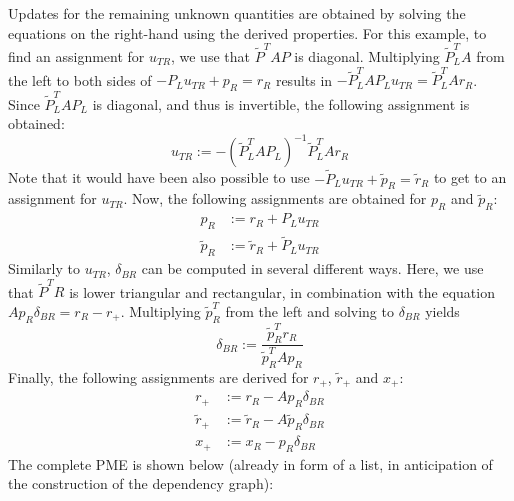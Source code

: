 %
Updates for the remaining unknown quantities are obtained by solving the equations on the right-hand using the derived properties. For this example, to find an assignment for $u_{TR}$, we use that $\tilde{P}^T A P$ is diagonal. Multiplying $\tilde{P}_L^T A$ from the left to both sides of $- P_L u_{TR} + p_R = r_R$ results in $- \tilde{P}_L^T A P_L u_{TR} = \tilde{P}_L^T A r_R$. Since $\tilde{P}_L^T A P_L$ is diagonal, and thus is invertible, the following assignment is obtained:
%
$$u_{TR} := - \left( \tilde{P}_L^T A P_L \right)^{-1} \tilde{P}_L^T A r_R$$
%
Note that it would have been also possible to use $- \tilde{P}_L u_{TR} + \tilde{p}_R = \tilde{r}_R$ to get to an assignment for $u_{TR}$.  Now, the following assignments are obtained for $p_R$ and $\tilde{p}_R$:
%
\begin{align*}
p_R &:= r_R +  P_L u_{TR} \\
\tilde{p}_R &:= \tilde{r}_R + \tilde{P}_L u_{TR}
\end{align*}
%
Similarly to $u_{TR}$, $\delta_{BR}$ can be computed in several different ways. Here, we use that $\tilde{P}^T R$ is lower triangular and rectangular, in combination with the equation $A p_R \delta_{BR} = r_R - r_+$. Multiplying $\tilde{p}_R^T$ from the left and solving to $\delta_{BR}$ yields
%
$$\delta_{BR} := \frac{\tilde{p}_R^T r_R}{\tilde{p}_R^T A p_R}$$
%
Finally, the following assignments are derived for $r_+$, $\tilde{r}_+$ and $x_+$:
%
\begin{align*}
r_+ &:= r_R -  A p_R \delta_{BR} \\
\tilde{r}_+ &:= \tilde{r}_R - A \tilde{p}_R \delta_{BR} \\
x_+ & := x_R -  p_R \delta_{BR}
\end{align*}
%
The complete PME is shown below (already in form of a list, in anticipation of the construction of the dependency graph):
%

